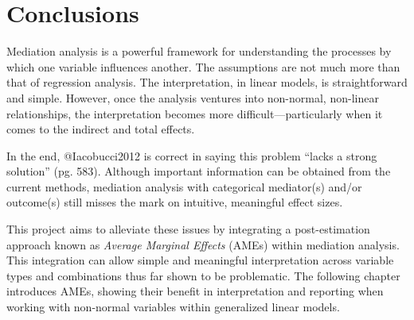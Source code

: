 \documentclass[]{article}
\begin{document}
\section{Conclusions}\label{conclusions}

Mediation analysis is a powerful framework for understanding the
processes by which one variable influences another. The assumptions are
not much more than that of regression analysis. The interpretation, in
linear models, is straightforward and simple. However, once the analysis
ventures into non-normal, non-linear relationships, the interpretation
becomes more difficult---particularly when it comes to the indirect and
total effects.

In the end, @Iacobucci2012 is correct in saying this problem ``lacks a
strong solution'' (pg. 583). Although important information can be
obtained from the current methods, mediation analysis with categorical
mediator(s) and/or outcome(s) still misses the mark on intuitive,
meaningful effect sizes.

This project aims to alleviate these issues by integrating a
post-estimation approach known as \emph{Average Marginal Effects} (AMEs)
within mediation analysis. This integration can allow simple and
meaningful interpretation across variable types and combinations thus
far shown to be problematic. The following chapter introduces AMEs,
showing their benefit in interpretation and reporting when working with
non-normal variables within generalized linear models.

\singlespacing
\end{document}
